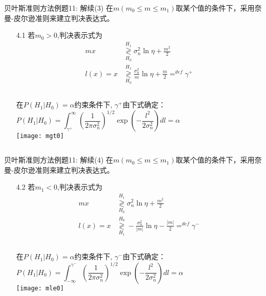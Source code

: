 \begin{frame}[shrink]{贝叶斯准则方法例题11: 解续(3)}
在$m(m_0\le m\le m_1)$取某个值的条件下，采用奈曼-皮尔逊准则来建立判决表达式。
\begin{enumerate}
	\item[4.1] 若$m_0>0$,判决表示式为
	\begin{align*}
	mx&\mathop{\gtrless}\limits_{H_0}^{H_1}\sigma_n^2\ln\eta+\frac{m^2}{2}\\
    l(x)=x&\mathop{\gtrless}\limits_{H_0}^{H_1}\frac{\sigma_n^2}{m}\ln\eta+\frac{m}{2}\mathop{=}^{def}\gamma^{+} 
	\end{align*}
	\begin{columns}
		在$P(H_1|H_0)=\alpha$约束条件下, $\gamma^{+}$由下式确定：
		\[ P(H_1|H_0)=\int_{\gamma^{+}}^{\infty}\left(\frac{1}{2\pi\sigma_n^2}\right)^{1/2}\exp\left(-\frac{l^2}{2\sigma_n^2}\right)dl=\alpha \]
		\texttt{[image: mgt0]}
	\end{columns}
\end{enumerate} 
\end{frame}

\begin{frame}[shrink]{贝叶斯准则方法例题11: 解续(4)}
在$m(m_0\le m\le m_1)$取某个值的条件下，采用奈曼-皮尔逊准则来建立判决表达式。
\begin{enumerate}
	\item[4.2] 若$m_1<0$,判决表示式为
	\begin{align*}
	mx&\mathop{\gtrless}\limits_{H_0}^{H_1}\sigma_n^2\ln\eta+\frac{m^2}{2}\\
	l(x)=x&\mathop{\gtrless}\limits_{H_1}^{H_0}-\frac{\sigma_n^2}{|m|}\ln\eta-\frac{|m|}{2}\mathop{=}^{def}\gamma^{-}
	\end{align*}
	\begin{columns}
		\column{0.7\textwidth}
		在$P(H_1|H_0)=\alpha$约束条件下, $\gamma^{-}$由下式确定：
		\[ P(H_1|H_0)=\int_{-\infty}^{\gamma^{-}}\left(\frac{1}{2\pi\sigma_n^2}\right)^{1/2}\exp\left(-\frac{l^2}{2\sigma_n^2}\right)dl=\alpha \]
		\column{0.4\textwidth}
		\texttt{[image: mle0]}
	\end{columns}
\end{enumerate} 
\end{frame}

